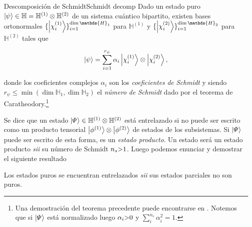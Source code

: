 \documentclass{report} %
\newcommand{\sii}{\textit{sii }}
\numberwithin{equation}{section}
\begin{document}
\begin{theo}{Descomposición de Schmidt}{Schmidt decomp}
Dado un estado puro $\ket{\psi} \in \mathbb{H} =\mathbb{H}^{(1)} \otimes \mathbb{H}^{(2)}$ de un sistema cuántico bipartito, existen bases ortonormales $\{\ket{\chi_i^{(1)}}\}_{i=1}^{\dim \mathds{H}_1}$ para $\mathbb{H}^{(1)}$ y $\{ \ket{\chi_i^{(2)}}\}_{i=1}^{\dim \mathds{H}_2}$ para $\mathbb{H}^{(2)}$ tales que 

\begin{equation}
    \ket{\psi} = \sum_{i=1}^{r_\psi} \alpha_{i}  \ket{\chi_i^{(1)}} \otimes \ket{\chi_i^{(2)}},
\end{equation}

donde los coeficientes complejos $\alpha_i$ son los \textit{coeficientes de Schmidt} y siendo $r_\psi \leq \min(\dim \mathds{H}_1, \dim \mathds{H}_2)$ el \textit{número de Schmidt} dado por el teorema de Caratheodory.\footnote{Una demostración del teorema precedente puede encontrarse en \cite{Nielsen.00, B.C.G.STR, HeinzPetruccione}. Notemos que si $\ket{\Psi}$ está normalizado luego $\alpha_i \mbox{\textgreater} 0$ y $\sum_i^{n_s}\alpha_i^2 = 1$.}
\end{theo}

Se dice que un estado $\ket{\Psi} \in \mathbb{H}^{(1)} \otimes \mathbb{H}^{(2)}$ está entrelazado si no puede ser escrito como un producto tensorial $\ket{\phi^{(1)}} \otimes \ket{\phi^{(2)}}$ de estados de los subsistemas. Si $\ket{\Psi}$ puede ser escrito de esta forma, es un \textit{estado producto}.  Un estado será un estado producto \sii su número de Schmidt $n_s \mbox{\textgreater} 1$. Luego podemos enunciar y demostrar el siguiente resultado

\begin{tcolorbox}[colback=red!5!white, colframe=red!50!black, title= Lema sobre \textit{entanglement} de estados puros]

Los estados puros se encuentran entrelazados \textit{sii} sus estados parciales no son puros.
\end{tcolorbox}
\end{document}
